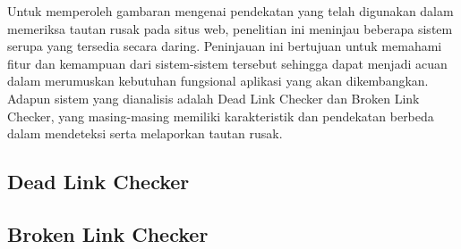 Untuk memperoleh gambaran mengenai pendekatan yang telah digunakan dalam memeriksa tautan rusak pada situs web, penelitian ini meninjau beberapa sistem serupa yang tersedia secara daring. Peninjauan ini bertujuan untuk memahami fitur dan kemampuan dari sistem-sistem tersebut sehingga dapat menjadi acuan dalam merumuskan kebutuhan fungsional aplikasi yang akan dikembangkan. Adapun sistem yang dianalisis adalah Dead Link Checker dan Broken Link Checker, yang masing-masing memiliki karakteristik dan pendekatan berbeda dalam mendeteksi serta melaporkan tautan rusak.


\subsection{Dead Link Checker}
\label{subsec:0302-dead-link-checker}



\subsection{Broken Link Checker}
\label{subsec:0302-broken-link-checker}
